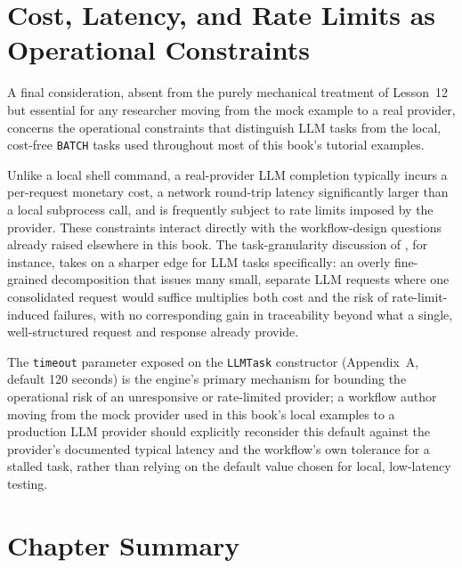 \section{Cost, Latency, and Rate Limits as Operational Constraints}

A final consideration, absent from the purely mechanical treatment of
Lesson~12 but essential for any researcher moving from the mock example to a
real provider, concerns the operational constraints that distinguish LLM
tasks from the local, cost-free \texttt{BATCH} tasks used throughout most of
this book's tutorial examples.

Unlike a local shell command, a real-provider LLM completion typically
incurs a per-request monetary cost, a network round-trip latency
significantly larger than a local subprocess call, and is frequently
subject to rate limits imposed by the provider. These constraints interact
directly with the workflow-design questions already raised elsewhere in
this book. The task-granularity discussion of ,
for instance, takes on a sharper edge for LLM tasks specifically: an
overly fine-grained decomposition that issues many small, separate LLM
requests where one consolidated request would suffice multiplies both cost
and the risk of rate-limit-induced failures, with no corresponding gain in
traceability beyond what a single, well-structured request and response
already provide.

\begin{practicebox}
The \texttt{timeout} parameter exposed on the \texttt{LLMTask} constructor
(Appendix~A, default 120 seconds) is the engine's primary mechanism for
bounding the operational risk of an unresponsive or rate-limited provider;
a workflow author moving from the mock provider used in this book's local
examples to a production LLM provider should explicitly reconsider this
default against the provider's documented typical latency and the
workflow's own tolerance for a stalled task, rather than relying on the
default value chosen for local, low-latency testing.
\end{practicebox}

\section{Chapter Summary}


